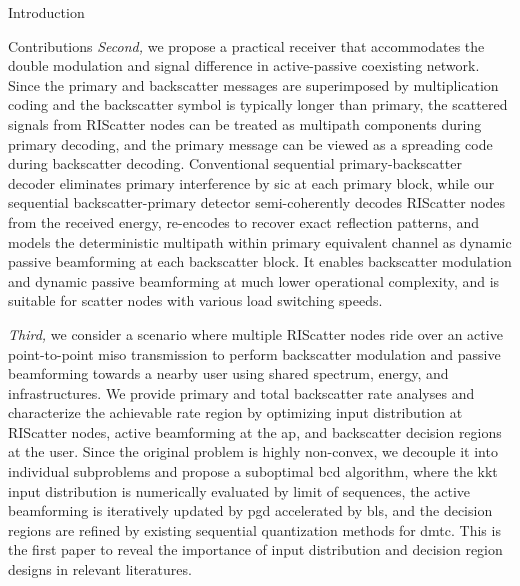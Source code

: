 \documentclass[journal]{IEEEtran}
\begin{document}
\begin{section}{Introduction}
\begin{subsection}{Contributions}
		\emph{Second,} we propose a practical receiver that accommodates the double modulation and signal difference in active-passive coexisting network.
		Since the primary and backscatter messages are superimposed by multiplication coding and the backscatter symbol is typically longer than primary, the scattered signals from RIScatter nodes can be treated as multipath components during primary decoding, and the primary message can be viewed as a spreading code during backscatter decoding.
		Conventional sequential primary-backscatter decoder eliminates primary interference by \gls{sic} at each primary block, while our sequential backscatter-primary detector semi-coherently decodes RIScatter nodes from the received energy, re-encodes to recover exact reflection patterns, and models the deterministic multipath within primary equivalent channel as dynamic passive beamforming at each backscatter block.
		It enables backscatter modulation and dynamic passive beamforming at much lower operational complexity, and is suitable for scatter nodes with various load switching speeds.

		\emph{Third,} we consider a scenario where multiple RIScatter nodes ride over an active point-to-point \gls{miso} transmission to perform backscatter modulation and passive beamforming towards a nearby user using shared spectrum, energy, and infrastructures.
		We provide primary and total backscatter rate analyses and characterize the achievable rate region by optimizing input distribution at RIScatter nodes, active beamforming at the \gls{ap}, and backscatter decision regions at the user.
		Since the original problem is highly non-convex, we decouple it into individual subproblems and propose a suboptimal \gls{bcd} algorithm, where the \gls{kkt} input distribution is numerically evaluated by limit of sequences, the active beamforming is iteratively updated by \gls{pgd} accelerated by \gls{bls}, and the decision regions are refined by existing sequential quantization methods for \gls{dmtc}.
		This is the first paper to reveal the importance of input distribution and decision region designs in relevant literatures.


\end{subsection}
\end{section}
\end{document}
